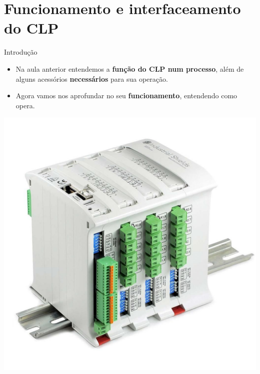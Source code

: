 \section{Funcionamento e interfaceamento do CLP}

\begin{frame}{Introdução}
	\begin{block}{}
		\begin{itemize}
			\item Na aula anterior entendemos a \textbf{função do CLP num processo}, além de alguns acessórios \textbf{necessários} para sua operação.
			\item Agora vamos nos aprofundar no seu \textbf{funcionamento}, entendendo como opera.
		\end{itemize}
	\end{block}

	\centering
	
	\includegraphics[height=0.6\textheight]{Figuras/Ch09/fig1}
\end{frame}


